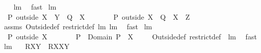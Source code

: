 \begin{isabellebody}
%
\isadelimproof
\ \ %
\endisadelimproof
%
\isatagproof
{}\isamarkupfalse%
\ lm{}{}{}\ \isamarkupfalse%
\ fast%
\endisatagproof
{\isafoldproof}%
%
\isadelimproof
\isanewline
%
\endisadelimproof
\isanewline
{}\isamarkupfalse%
\ lm{}{}{}{\isacharcolon}\ \isanewline
\ \ {\isachardoublequoteopen}{\isacharparenleft}P\ outside\ {\isacharparenleft}X\ {\isasymunion}\ Y{\isacharparenright}{\isacharparenright}\ {\isasyminter}\ {\isacharparenleft}Q\ {\isacharbar}{\isacharbar}\ X{\isacharparenright}\ {\isacharequal}\ {\isacharbraceleft}{\isacharbraceright}\ \ \ {\isacharampersand}\ \ \ {\isacharparenleft}P\ outside\ X{\isacharparenright}\ {\isasyminter}\ {\isacharparenleft}Q\ {\isacharbar}{\isacharbar}\ {\isacharparenleft}X\ {\isasyminter}\ Z{\isacharparenright}{\isacharparenright}\ {\isacharequal}\ {\isacharbraceleft}{\isacharbraceright}{\isachardoublequoteclose}\ \isanewline
%
\isadelimproof
\ \ %
\endisadelimproof
%
\isatagproof
{}\isamarkupfalse%
\ assms\ Outside{\isacharunderscore}def\ restrict{\isacharunderscore}def\ lm{}{}{}\ lm{}{}{}\ \isamarkupfalse%
\ fast%
\endisatagproof
{\isafoldproof}%
%
\isadelimproof
\isanewline
%
\endisadelimproof
\isanewline
{}\isamarkupfalse%
\ lm{}{}{}{\isacharcolon}\ \isanewline
\ \ {\isachardoublequoteopen}P\ outside\ X\ \ \ \ {\isacharequal}\ \ \ \ P\ {\isacharbar}{\isacharbar}\ {\isacharparenleft}{\isacharparenleft}Domain\ P{\isacharparenright}\ {\isacharminus}\ X{\isacharparenright}{\isachardoublequoteclose}\ \isanewline
%
\isadelimproof
\ \ %
\endisadelimproof
%
\isatagproof
{}\isamarkupfalse%
\ Outside{\isacharunderscore}def\ restrict{\isacharunderscore}def\ \ lm{}{}{}\ \isamarkupfalse%
\ fast%
\endisatagproof
{\isafoldproof}%
%
\isadelimproof
\isanewline
%
\endisadelimproof
\isanewline
{}\isamarkupfalse%
\ lm{}{}{}{\isacharcolon}\ \isanewline
\ \ {\isachardoublequoteopen}R{\isacharbackquote}{\isacharbackquote}{\isacharparenleft}X{\isacharminus}Y{\isacharparenright}\ {\isacharequal}\ {\isacharparenleft}R{\isacharbar}{\isacharbar}X{\isacharparenright}{\isacharbackquote}{\isacharbackquote}{\isacharparenleft}X{\isacharminus}Y{\isacharparenright}{\isachardoublequoteclose}\ \isanewline
%
\isadelimproof
\ \ %
\endisadelimproof
%
\isatagproof
{}\isamarkupfalse%

\end{isabellebody}
